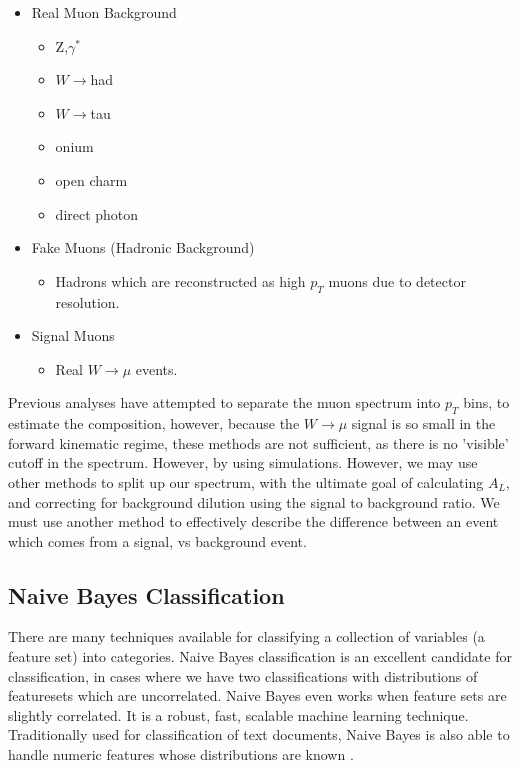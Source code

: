 \begin{itemize}
	\item Real Muon Background
		\begin{itemize}
			\item Z,$\gamma^*$
			\item $W\rightarrow$had
			\item $W\rightarrow$tau
		  \item onium
			\item open charm
			\item direct photon
		\end{itemize}
	\item Fake Muons (Hadronic Background)
		\begin{itemize}	
			\item Hadrons which are reconstructed as high $p_T$ muons due to detector
			resolution.
		\end{itemize}
	\item Signal Muons
		\begin{itemize}	
			\item Real $W\rightarrow\mu$ events.
		\end{itemize}
\end{itemize}

Previous analyses have attempted to separate the muon spectrum into $p_T$ bins,
to estimate the composition, however, because the $W\rightarrow\mu$ signal is so
small in the forward kinematic regime, these methods are not sufficient, as
there is no 'visible' cutoff in the spectrum. However, by using simulations.
However, we may use other methods to split up our spectrum, with the ultimate
goal of calculating $A_L$, and correcting for background dilution using the
signal to background ratio. We must use another method to effectively describe
the difference between an event which comes from a signal, vs background event.

\subsection{Naive Bayes Classification}
There are many techniques available for classifying a collection of variables
(a feature set) into categories. Naive Bayes classification is an excellent
candidate for classification, in cases where we have two classifications with
distributions of featuresets which are uncorrelated. Naive Bayes even works when
feature sets are slightly correlated. It is a robust, fast, scalable machine
learning technique. Traditionally used for classification of text documents,
Naive Bayes is also able to handle numeric features whose distributions are
known \cite{Collins2013}.

